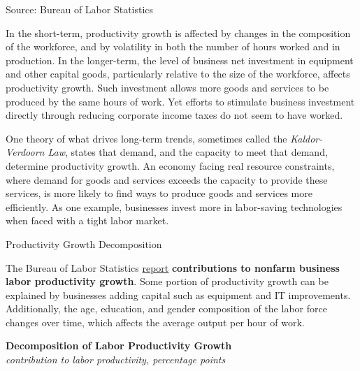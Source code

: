\documentclass{report}
\newcommand{\tbllink}[1]{\href{https://raw.githubusercontent.com/bdecon/US-chartbook/master/chartbook/data/#1}{\faTable}}
\begin{document}
{\begin{minipage}{0.76\textwidth}
\footnotesize{Source: Bureau of Labor Statistics} \hfill \tbllink{lprod.csv}
\vspace{1mm}

\small In the short-term, productivity growth is affected by changes in the composition of the workforce, and by volatility in both the number of hours worked and in production. In the longer-term, the level of business net investment in equipment and other capital goods, particularly relative to the size of the workforce, affects productivity growth. Such investment allows more goods and services to be produced by the same hours of work. Yet efforts to stimulate business investment directly through reducing corporate income taxes do not seem to have worked. 

One theory of what drives long-term trends, sometimes called the \textit{Kaldor-Verdoorn Law}, states that demand, and the capacity to meet that demand, determine productivity growth. An economy facing real resource constraints, where demand for goods and services exceeds the capacity to provide these services, is more likely to find ways to produce goods and services more efficiently. As one example, businesses invest more in labor-saving technologies when faced with a tight labor market. 
\end{minipage}
\newpage
\begin{minipage}{0.76\textwidth}  
\normalsize Productivity Growth Decomposition
\vspace{-1mm} 

\small The Bureau of Labor Statistics \href{https://www.bls.gov/news.release/prod3.nr0.htm}{report} \textbf{contributions to nonfarm business labor productivity growth}. Some portion of productivity growth can be explained by businesses adding capital such as equipment and IT improvements. Additionally, the age, education, and gender composition of the labor force changes over time, which affects the average output per hour of work. 


\vspace{2mm}

\normalsize \textbf{Decomposition of Labor Productivity Growth}\\
\footnotesize{\textit{contribution to labor productivity, percentage points}}
\vspace{4.85cm}


\end{minipage}}
\end{document}
